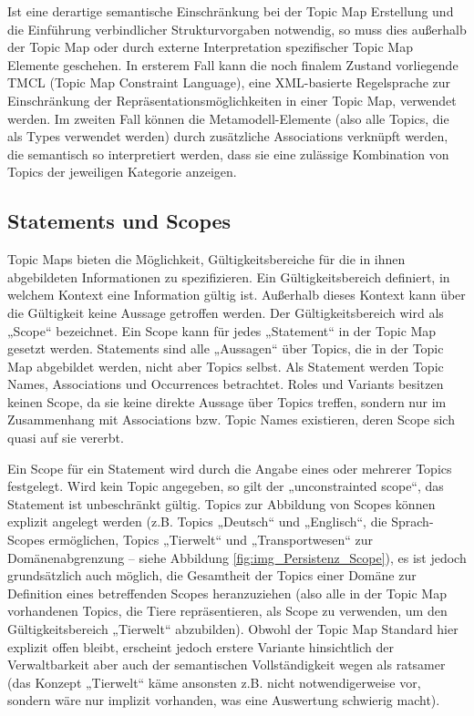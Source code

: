 Ist eine derartige semantische Einschränkung bei der Topic Map Erstellung und die Einführung verbindlicher Strukturvorgaben notwendig, so muss dies außerhalb der Topic Map oder durch externe Interpretation spezifischer Topic Map Elemente geschehen. In ersterem Fall kann die noch finalem Zustand vorliegende TMCL (Topic Map Constraint Language), eine XML-basierte Regelsprache zur Einschränkung der Repräsentationsmöglichkeiten in einer Topic Map, verwendet werden. Im zweiten Fall können die Metamodell-Elemente (also alle Topics, die als Types verwendet werden) durch zusätzliche Associations verknüpft werden, die semantisch so interpretiert werden, dass sie eine zulässige Kombination von Topics der jeweiligen Kategorie anzeigen.


\subsection{Statements und Scopes} %
\label{sub:scopes}

Topic Maps bieten die Möglichkeit, Gültigkeitsbereiche für die in ihnen abgebildeten Informationen zu spezifizieren. Ein Gültigkeitsbereich definiert, in welchem Kontext eine Information gültig ist. Außerhalb dieses Kontext kann über die Gültigkeit keine Aussage getroffen werden. Der Gültigkeitsbereich wird als „Scope“ bezeichnet. Ein Scope kann für jedes „Statement“ in der Topic Map gesetzt werden. Statements sind alle „Aussagen“ über Topics, die in der Topic Map abgebildet werden, nicht aber Topics selbst. Als Statement werden Topic Names, Associations und Occurrences betrachtet. Roles und Variants besitzen keinen Scope, da sie keine direkte Aussage über Topics treffen, sondern nur im Zusammenhang mit Associations bzw. Topic Names existieren, deren Scope sich quasi auf sie vererbt.

Ein Scope für ein Statement wird durch die Angabe eines oder mehrerer Topics festgelegt. Wird kein Topic angegeben, so gilt der „unconstrainted scope“, das Statement ist unbeschränkt gültig. Topics zur Abbildung von Scopes können explizit angelegt werden (z.B. Topics „Deutsch“ und „Englisch“, die Sprach-Scopes ermöglichen, Topics „Tierwelt“ und „Transportwesen“ zur Domänenabgrenzung -- siehe Abbildung \ref{fig:img_Persistenz_Scope}), es ist jedoch grundsätzlich auch möglich, die Gesamtheit der Topics einer Domäne zur Definition eines betreffenden Scopes heranzuziehen (also alle in der Topic Map vorhandenen Topics, die Tiere repräsentieren, als Scope zu verwenden, um den Gültigkeitsbereich „Tierwelt“ abzubilden). Obwohl der Topic Map Standard hier explizit offen bleibt, erscheint jedoch erstere Variante hinsichtlich der Verwaltbarkeit aber auch der semantischen Vollständigkeit wegen als ratsamer (das Konzept „Tierwelt“ käme ansonsten z.B. nicht notwendigerweise vor, sondern wäre nur implizit vorhanden, was eine Auswertung schwierig macht).

